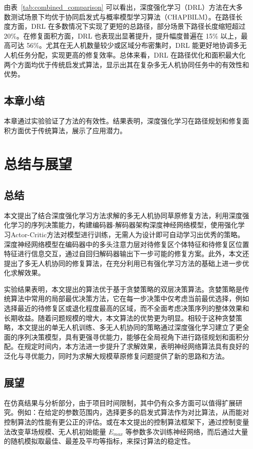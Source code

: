 \documentclass[AutoFakeBold]{LZUThesis}
\begin{document}
由表~\ref{tab:combined_comparison} 可以看出，深度强化学习（DRL）方法在大多数测试场景下均优于协同启发式与概率模型学习算法（CHAPBILM）。在路径长度方面，DRL 在多数情况下实现了更短的总路径，部分场景下路径长度缩短超过 20\%。在修复面积方面，DRL 也表现出显著提升，提升幅度普遍在 15\% 以上，最高可达 56\%。尤其在无人机数量较少或区域分布密集时，DRL 能更好地协调多无人机任务分配，实现更高的修复效率。总体来看，DRL 在路径优化和面积最大化两个方面均优于传统启发式算法，显示出其在复杂多无人机协同任务中的有效性和优势。

\section{本章小结}
本章通过实验验证了方法的有效性。结果表明，深度强化学习在路径规划和修复面积方面优于传统算法，展示了应用潜力。

\chapter{总结与展望}

\section{总结}
本文提出了结合深度强化学习方法求解的多无人机协同草原修复方法，利用深度强化学习的序列决策能力，构建编码器-解码器架构深度神经网络模型，使用强化学习Actor-Critic方法对模型进行训练，无需人为设计即可自动学习出优秀的策略。深度神经网络模型在编码器中的多头注意力层对待修复区个体特征和待修复区位置特征进行信息交互，通过自回归解码器输出下一步可能的修复方案。此外，本文还提出了多无人机协同的修复算法，在充分利用已有强化学习方法的基础上进一步优化求解效果。

实验结果表明，本文提出的算法优于基于贪婪策略的双层决策算法。贪婪策略是传统算法中常用的局部最优决策方法，它在每一步决策中仅考虑当前最优选择，例如选择最近的待修复区或退化程度最高的区域，而不全面考虑决策序列的整体效果和长期收益。随着问题规模的增大，本文算法的优势更为明显。相较于这种贪婪策略，本文提出的单无人机训练、多无人机协同的策略通过深度强化学习建立了更全面的序列决策模型，具有更强寻优能力，能够在全局视角下进行路径规划和面积分配。在规定时间内，本方法进一步提升了求解效果，表明神经网络算法具有良好的泛化与寻优能力，同时为求解大规模草原修复问题提供了新的思路和方法。

\section{展望}
在仿真结果与分析部分，由于项目时间限制，其中仍有众多方面可以值得扩展研究。例如：在给定的参数范围内，选择更多的启发式算法作为对比算法，从而能对控制算法的性能有更公正的评估。或在本文提出的控制算法框架下，通过控制变量法改变草场规模、无人机初始能量 $E_{max}$ 等参数多次训练神经网络，而后通过大量的随机模拟取最佳、最差及平均等指标，来探讨算法的稳定性。
\end{document}
